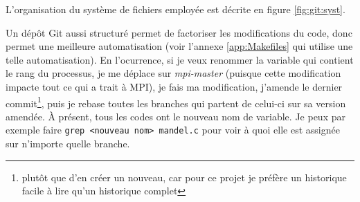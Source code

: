 L'organisation du système de fichiers employée est décrite en figure
\ref{fig:git:syst}.

Un dépôt Git aussi structuré permet de factoriser les modifications du
code, donc permet une meilleure automatisation (voir l'annexe
\ref{app:Makefiles} qui utilise une telle automatisation). En
l'ocurrence, si je veux renommer la variable qui contient le rang du
processus, je me déplace sur \emph{mpi-master} (puisque cette
modification impacte tout ce qui a trait à MPI), je fais ma
modification, j'amende le dernier commit\footnote{plutôt que d'en
  créer un nouveau, car pour ce projet je préfère un historique facile
  à lire qu'un historique complet}, puis je rebase toutes les branches
qui partent de celui-ci sur sa version amendée. À présent, tous les
codes ont le nouveau nom de variable. Je peux par exemple faire
\texttt{grep <nouveau nom> mandel.c} pour voir à quoi elle est
assignée sur n'importe quelle branche.

\clearpage



